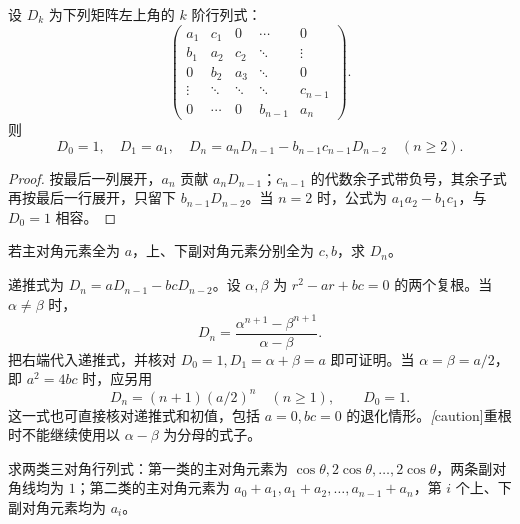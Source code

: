 \begin{proposition}[三对角行列式]
\label{prop:xie-ex-det-tridiagonal}
设 $D_k$ 为下列矩阵左上角的 $k$ 阶行列式：
\[
\begin{pmatrix}
a_1&c_1&0&\cdots&0\\
b_1&a_2&c_2&\ddots&\vdots\\
0&b_2&a_3&\ddots&0\\
\vdots&\ddots&\ddots&\ddots&c_{n-1}\\
0&\cdots&0&b_{n-1}&a_n
\end{pmatrix}.
\]
则
\begin{equation}
\label{eq:xie-ex-det-tridiagonal}
D_0=1,\quad D_1=a_1,\quad
D_n=a_nD_{n-1}-b_{n-1}c_{n-1}D_{n-2}\quad(n\geq2).
\end{equation}
\end{proposition}

\begin{proof}
按最后一列展开，$a_n$ 贡献 $a_nD_{n-1}$；$c_{n-1}$ 的代数余子式带负号，其余子式再按最后一行展开，只留下 $b_{n-1}D_{n-2}$。当 $n=2$ 时，公式为 $a_1a_2-b_1c_1$，与 $D_0=1$ 相容。
\end{proof}

\begin{example}
\label{ex:xie-ex-det-constant-tridiagonal}
若主对角元素全为 $a$，上、下副对角元素分别全为 $c,b$，求 $D_n$。
\end{example}

\begin{solve}
递推式为 $D_n=aD_{n-1}-bcD_{n-2}$。设 $\alpha,\beta$ 为 $r^2-ar+bc=0$ 的两个复根。当 $\alpha\ne\beta$ 时，
\begin{equation}
\label{eq:xie-ex-det-tridiagonal-distinct}
D_n=\frac{\alpha^{n+1}-\beta^{n+1}}{\alpha-\beta}.
\end{equation}
把右端代入递推式，并核对 $D_0=1,D_1=\alpha+\beta=a$ 即可证明。当 $\alpha=\beta=a/2$，即 $a^2=4bc$ 时，应另用
\begin{equation}
\label{eq:xie-ex-det-tridiagonal-repeated}
D_n=(n+1)(a/2)^n\quad(n\geq1),\qquad D_0=1.
\end{equation}
这一式也可直接核对递推式和初值，包括 $a=0,bc=0$ 的退化情形。\emph[caution]{重根时不能继续使用以 $\alpha-\beta$ 为分母的式子。}
\end{solve}

\begin{example}
\label{ex:xie-ex-det-induction}
求两类三对角行列式：第一类的主对角元素为 $\cos\theta,2\cos\theta,\ldots,2\cos\theta$，两条副对角线均为 $1$；第二类的主对角元素为 $a_0+a_1,a_1+a_2,\ldots,a_{n-1}+a_n$，第 $i$ 个上、下副对角元素均为 $a_i$。
\end{example}

